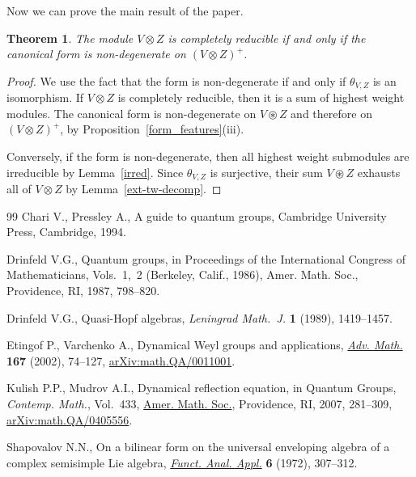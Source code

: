 \documentclass[11pt]{article}
\numberwithin{equation}{section}
\newtheorem{Theorem}{Theorem}[section]
\begin{document}
Now we can prove the main result of the paper.
\begin{Theorem} \label{dir-sum}The module $V\otimes Z$ is completely reducible if and only if the canonical form is non-degenerate on $(V\otimes Z)^+$.
\end{Theorem}
\begin{proof}We use the fact that the form is non-degenerate if and only if $\theta_{V,Z}$ is an isomorphism. If $V\otimes Z$ is completely reducible, then it is a sum of highest weight modules. The canonical form is non-degenerate on $V\circledast Z$ and therefore on $(V\otimes Z)^+$, by Proposition~\ref{form_features}(iii).

Conversely, if the form is non-degenerate, then all highest weight submodules are irreducible by Lemma~\ref{irred}. Since $\theta_{V,Z}$ is surjective, their sum $V\circledast Z$ exhausts all of $V\otimes Z$ by Lemma~\ref{ext-tw-decomp}.
\end{proof}
\begin{thebibliography}{99}
Chari V., Pressley A., A guide to quantum groups, Cambridge University Press,
 Cambridge, 1994.

Drinfeld V.G., Quantum groups, in Proceedings of the {I}nternational {C}ongress
 of {M}athematicians, {V}ols.~1,~2 ({B}erkeley, {C}alif., 1986), Amer. Math.
 Soc., Providence, RI, 1987, 798--820.

Drinfeld V.G., Quasi-{H}opf algebras, \textit{Leningrad Math.~J.} \textbf{1}
 (1989), 1419--1457.

Etingof P., Varchenko A., Dynamical {W}eyl groups and applications,
 \href{https://doi.org/10.1006/aima.2001.2034}{\textit{Adv. Math.}} \textbf{167} (2002), 74--127, \href{https://arxiv.org/abs/math.QA/0011001}{arXiv:math.QA/0011001}.

Kulish P.P., Mudrov A.I., Dynamical reflection equation, in Quantum Groups,
 \textit{Contemp. Math.}, Vol.~433, \href{https://doi.org/10.1090/conm/433/08331}{Amer. Math. Soc.}, Providence, RI, 2007,
 281--309, \href{https://arxiv.org/abs/math.QA/0405556}{arXiv:math.QA/0405556}.

Shapovalov N.N., On a bilinear form on the universal enveloping algebra of a
 complex semisimple {L}ie algebra, \href{https://doi.org/10.1007/BF01077650}{\textit{Funct. Anal. Appl.}} \textbf{6}
 (1972), 307--312.

\end{thebibliography}
\end{document}
